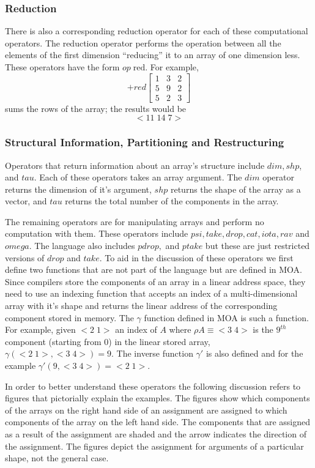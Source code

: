 \subsubsection{Reduction}
There is also a corresponding reduction operator for each of these 
computational operators.  The reduction operator performs the operation
between all the elements of the first dimension ``reducing'' it to an
array of one dimension less.  These operators have the form $op\;\mbox{red}$.  
For example, 
$$ + red \left[ \begin{array}{lll}
1 & 3 & 2 \\
5 & 9 & 2 \\
5 & 2 & 3
\end{array} \right]$$
sums the rows of the array; the results would be
$$< 11\; 14\; 7 >$$

\subsubsection{Structural Information, Partitioning and Restructuring}
Operators that return information about an array's structure include
$dim, shp$, and $tau$.  Each of these operators takes an array argument.
The $dim$ operator returns the dimension of it's argument, $shp$ returns
the shape of the array as a vector, and $tau$ returns the total number of
the components in the array.  

The remaining operators are for manipulating arrays and perform no computation
with them.  These operators include $psi, take, drop, cat, iota, rav$ and 
$omega$.  The language also includes $pdrop,$ and $ptake$ but these are just
restricted versions of $drop$ and $take$.
To aid in the discussion of these operators we first define two
functions that are not part of the language but are defined in MOA.  Since
compilers store the components of an array in a linear address space, they
need to use an indexing function that accepts an index of a multi-dimensional
array with it's shape and returns the linear address of the corresponding 
component stored in memory.  The $\gamma$ function defined in MOA is such a
function.  For example, given $<2\;1>$ an index of $A$ 
where $\rho A\equiv <3\;4>$ 
is the $9^{th}$ component (starting from 0) in the linear stored array,
$\gamma(<2\;1>,<3\;4>)=9$.  The inverse function $\gamma'$ is also defined and
for the example $\gamma'(9,<3\;4>)=<2\;1>$.

In order to better understand these operators the following discussion
refers to figures that pictorially explain the examples.  The figures
show which components of the arrays on the right hand side of an assignment
are assigned to which components of the array on the left hand side.  The
components that are assigned as a result of the assignment are shaded and
the arrow indicates the direction of the assignment.  The figures depict
the assignment for arguments of a particular shape, not the general case.

